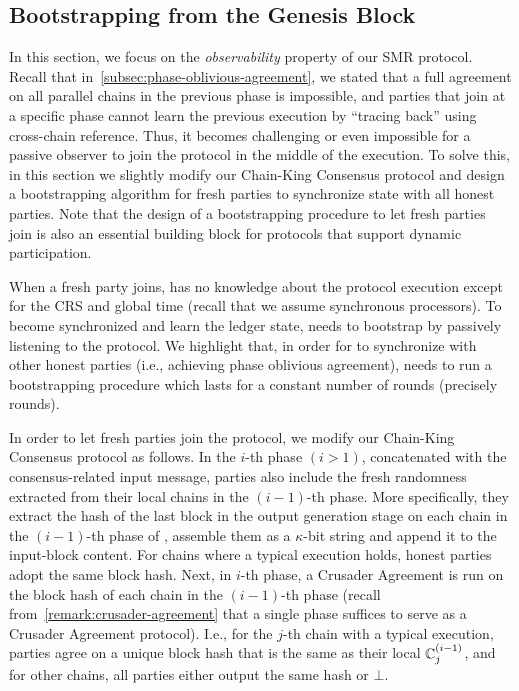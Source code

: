 \subsection{Bootstrapping from the Genesis Block}
\label{subsec:bootstrapping-from-genesis}

In this section, we focus on the \emph{observability} property of our SMR protocol.
%
Recall that in~\cref{subsec:phase-oblivious-agreement}, we stated that a full agreement on all parallel chains in the previous phase is impossible, and parties that join at a specific phase cannot learn the previous execution by ``tracing back'' using cross-chain reference.
%
Thus, it becomes challenging or even impossible for a passive observer to join the protocol in the middle of the execution.
%
To solve this, in this section we slightly modify our Chain-King Consensus protocol and design a bootstrapping algorithm for fresh parties to synchronize state with all honest parties.
%
Note that the design of a bootstrapping procedure to let fresh parties join is also an essential building block for protocols that support dynamic participation.

When a fresh party \newParty joins, \newParty has no knowledge about the protocol execution except for the CRS and global time (recall that we assume synchronous processors).
%
To become synchronized and learn the ledger state, \newParty needs to bootstrap by passively listening to the protocol.
%
We highlight that, in order for \newParty to synchronize with other honest parties (i.e., achieving phase oblivious agreement), \newParty needs to run a bootstrapping procedure which lasts for a constant number of rounds (precisely \phaseLength rounds).

In order to let fresh parties join the protocol, we modify our Chain-King Consensus protocol as follows.
%
In the $i$-th phase $(i > 1)$, concatenated with the consensus-related input message, parties also include the fresh randomness extracted from their local chains in the $(i - 1)$-th phase.
%
More specifically, they extract the hash of the last block in the output generation stage on each chain in the $(i - 1)$-th phase of \parallelChainsLocal, assemble them as a $\kappa$-bit string and append it to the input-block content.
%
For chains where a typical execution holds, honest parties adopt the same block hash.
%
Next, in $i$-th phase, a Crusader Agreement is  run on the block hash of each chain in the $(i - 1)$-th phase (recall from~\cref{remark:crusader-agreement} that a single phase suffices to serve as a Crusader Agreement protocol).
%
I.e., for the $j$-th chain with a typical execution, parties agree on a unique block hash that is the same as their local $\mathbb{C}^{(i - 1)}_j$, and for other chains, all parties either output the same hash or $\bot$.

